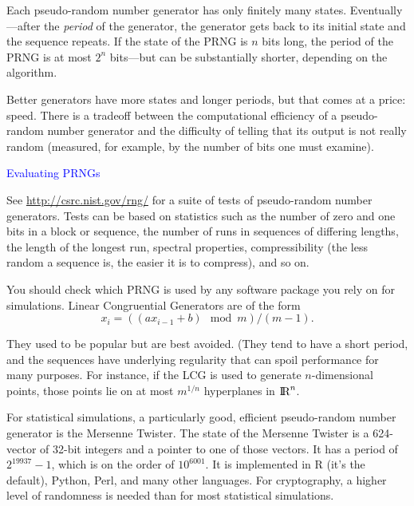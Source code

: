 \documentclass[landscape]{slides}
\def\Real{\hbox{I\kern-.17em\hbox{R}}}
\newcommand{\bfR}{\Real}
\begin{document}
\begin{slide}
	
	Each pseudo-random number generator has only finitely many states.
	Eventually---after the {\em period\/} of the generator, the generator
	gets back to its initial state and the sequence repeats.	
	If the state of the PRNG is $n$ bits long, the period of the PRNG is at most
	$2^n$ bits---but can be substantially shorter, depending on the algorithm.

	Better generators have more states and longer periods, but that comes
	at a price: speed.
        There is a tradeoff between the computational efficiency of a pseudo-random
        number generator and the difficulty of telling that its output is not really
    random (measured, for example, by the number of bits one must examine).

\end{slide}

\begin{slide}
{\textcolor{blue}{Evaluating PRNGs}}

    
    See \url{http://csrc.nist.gov/rng/} for a suite of tests of pseudo-random number
	generators.
	Tests can be based on statistics such as the number of zero and one bits in a
	block or sequence, the number of runs in sequences of differing lengths,
	the length of the longest run, spectral properties, compressibility (the less
	random a sequence is, the easier it is to compress), and so on.
  
\end{slide}

\begin{slide}
    
    You should check which PRNG is used by any software package you rely on
    for simulations.
   Linear Congruential Generators are of the form
$$ x_i = ((a x_{i-1} +b) \mod m)/(m-1).$$

    They used to be popular but are best avoided.
    (They tend to have a short period, and the sequences have underlying
	regularity that can spoil performance for many purposes.
     For instance, if the LCG is used to generate $n$-dimensional points, those points
     lie on at most $m^{1/n}$ hyperplanes in $\bfR^n$. 
     
     	For statistical simulations, a particularly good, efficient 
	pseudo-random number generator
	is the Mersenne Twister.
	The state of the Mersenne Twister is a 624-vector of 32-bit integers and a pointer to
	one of those vectors.
	It has a period of $2^{19937}-1$, which is on the order of $10^{6001}$.
	It is implemented in R (it's the default), Python, Perl, and many other languages.
	For cryptography, a higher level of randomness is needed than for most
	statistical simulations.

\end{slide}
\end{document}
